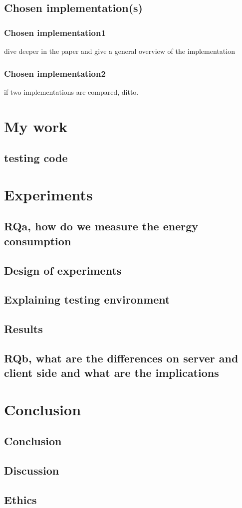 \documentclass[twoside]{Style/uva-inf-bachelor-thesis}
\begin{document}
\section{Chosen implementation(s)}
\subsection{Chosen implementation1}
dive deeper in the paper and give a general overview of the implementation
\subsection{Chosen implementation2}
if two implementations are compared, ditto.

\chapter{My work}
\section{testing code}

\chapter{Experiments}
\section{RQa, how do we measure the energy consumption}
\section{Design of experiments}
\section{Explaining testing environment}
\section{Results}
\section{RQb, what are the differences on server and client side and what are the implications}

\chapter{Conclusion}
\section{Conclusion}
\section{Discussion}
\section{Ethics}
\end{document}
